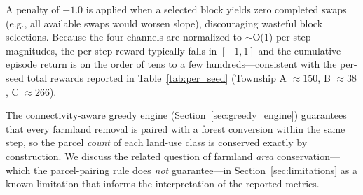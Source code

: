 \documentclass[preprint,12pt]{elsarticle}
\begin{document}
\begin{table}[htbp]
\centering
\caption{Policy interpretation of the reward components. The reported experiments use one fixed preference setting; alternative local priorities require re-running the scenario comparison rather than treating these weights as normative.}
\label{tab:reward_policy_meaning}
\end{table}

A penalty of $-1.0$ is applied when a selected block yields zero completed swaps (e.g., all available swaps would worsen slope), discouraging wasteful block selections. Because the four channels are normalized to $\sim$O(1) per-step magnitudes, the per-step reward typically falls in $[-1, 1]$ and the cumulative episode return is on the order of tens to a few hundreds---consistent with the per-seed total rewards reported in Table~\ref{tab:per_seed} (Township A $\approx 150$, B $\approx 38$, C $\approx 266$).

The connectivity-aware greedy engine (Section~\ref{sec:greedy_engine}) guarantees that every farmland removal is paired with a forest conversion within the same step, so the parcel \textit{count} of each land-use class is conserved exactly by construction. We discuss the related question of farmland \textit{area} conservation---which the parcel-pairing rule does \textit{not} guarantee---in Section~\ref{sec:limitations} as a known limitation that informs the interpretation of the reported metrics.
\end{document}
